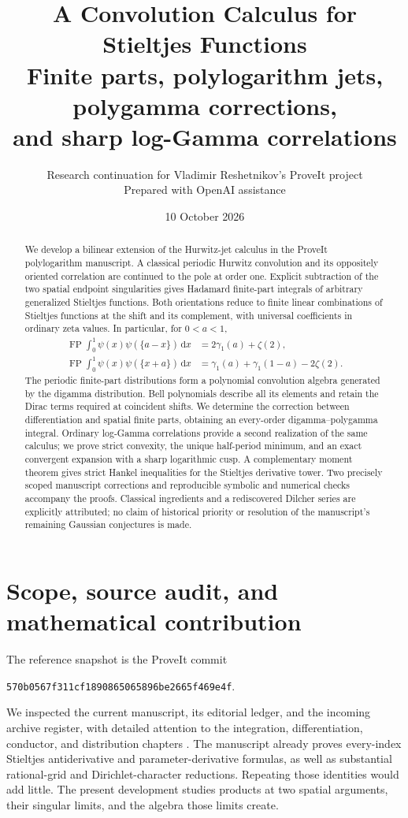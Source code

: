 \documentclass[11pt]{article}
\title{A Convolution Calculus for Stieltjes Functions\\[5pt]
\large Finite parts, polylogarithm jets, polygamma corrections,\\
and sharp log-Gamma correlations}
\author{Research continuation for Vladimir Reshetnikov's ProveIt project\\
\small Prepared with OpenAI assistance}
\date{10 October 2026}
\numberwithin{equation}{section}
\theoremstyle{definition}\newtheorem{definition}[theorem]{Definition}
\theoremstyle{remark}\newtheorem{remark}[theorem]{Remark}
\DeclareMathOperator{\FP}{FP}
\newcommand{\dd}{\,\mathrm d}
\begin{document}
\maketitle
\begin{abstract}
We develop a bilinear extension of the Hurwitz-jet calculus in the ProveIt
polylogarithm manuscript. A classical periodic Hurwitz convolution and its
oppositely oriented correlation are continued to the pole at order one.
Explicit subtraction of the two spatial endpoint singularities gives
Hadamard finite-part integrals of arbitrary generalized Stieltjes functions.
Both orientations reduce to finite linear combinations of Stieltjes
functions at the shift and its complement, with universal coefficients in
ordinary zeta values. In particular, for $0<a<1$,
\[
\begin{aligned}
 \FP\!\int_0^1\psi(x)\psi(\{a-x\})\dd x
 &=2\gamma_1(a)+\zeta(2),\\
 \FP\!\int_0^1\psi(x)\psi(\{x+a\})\dd x
 &=\gamma_1(a)+\gamma_1(1-a)-2\zeta(2).
\end{aligned}
\]
The periodic finite-part distributions form a polynomial convolution
algebra generated by the digamma distribution. Bell polynomials describe
all its elements and retain the Dirac terms required at coincident shifts.
We determine the correction between differentiation and spatial finite
parts, obtaining an every-order digamma--polygamma integral. Ordinary
log-Gamma correlations provide a second realization of the same calculus;
we prove strict convexity, the unique half-period minimum, and an exact
convergent expansion with a sharp logarithmic cusp. A complementary moment
theorem gives strict Hankel inequalities for the Stieltjes derivative
tower. Two precisely scoped manuscript corrections and reproducible
symbolic and numerical checks accompany the proofs. Classical ingredients
and a rediscovered Dilcher series are explicitly attributed; no claim of
historical priority or resolution of the manuscript's remaining Gaussian
conjectures is made.
\end{abstract}
\clearpage
\tableofcontents
\clearpage

\section{Scope, source audit, and mathematical contribution}
\label{sec:scope}

The reference snapshot is the ProveIt commit
\begin{center}\small\texttt{570b0567f311cf1890865065896be2665f469e4f}.\end{center}
We inspected the current manuscript, its editorial ledger, and the incoming
archive register, with detailed attention to the integration,
differentiation, conductor, and distribution chapters \cite{ProveIt}.
The manuscript already proves every-index Stieltjes antiderivative and
parameter-derivative formulas, as well as substantial rational-grid and
Dirichlet-character reductions. Repeating those identities would add
little. The present development studies products at two spatial arguments,
their singular limits, and the algebra those limits create.
\end{document}
